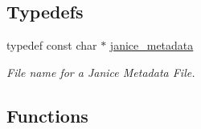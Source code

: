 \subsection*{Typedefs}
\begin{DoxyCompactItemize}
\item 
typedef const char $\ast$ \hyperlink{group__janice__io_ga98fb8d1945016f13408aa772de4c3e64}{janice\+\_\+metadata}
\begin{DoxyCompactList}\small\item\em File name for a Janice Metadata File. \end{DoxyCompactList}\end{DoxyCompactItemize}
\subsection*{Functions}
